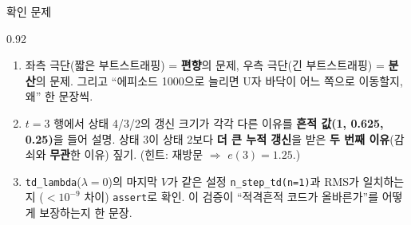 \begin{frame}{확인 문제}
\begin{center}\begin{varwidth}{0.92\textwidth}
  \begin{enumerate}
    \item {} 좌측 극단(짧은 부트스트래핑) = \textbf{
      편향}의 문제, 우측 극단(긴 부트스트래핑) = \textbf{분산}의
      문제. 그리고 ``에피소드 1000으로 늘리면 U자 바닥이 어느
      쪽으로 이동할지, 왜'' 한 문장씩.
    \item {} $t=3$ 행에서 상태 4/3/2의 갱신 크기가
      각각 다른 이유를 \textbf{흔적 값(1, 0.625, 0.25)}을 들어 설명.
      상태 3이 상태 2보다 \textbf{더 큰 누적 갱신}을 받은
      \textbf{두 번째 이유}(감쇠와 \textbf{무관}한 이유) 짚기.
      (힌트: 재방문 $\Rightarrow$ $e(3)=1.25$.)
    \item {} \texttt{td\_lambda}($\lambda=0$)의 마지막 $V$가
      같은 설정 \texttt{n\_step\_td(n=1)}과 RMS가 일치하는지
      ($<10^{-9}$ 차이) \texttt{assert}로 확인. 이 검증이
      ``적격흔적 코드가 올바른가''를 어떻게 보장하는지 한 문장.
  \end{enumerate}
\end{varwidth}\end{center}
\end{frame}
